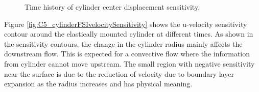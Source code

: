 \begin{figure}[H]
    \centering
    \quad
    \caption{Time history of cylinder center displacement sensitivity.}
    \label{fig:C5_cylinderDisplacementSensitivity}
\end{figure}
%
Figure \ref{fig:C5_cylinderFSIvelocitySensitivity} shows the u-velocity sensitivity contour around the elastically mounted cylinder at different times. As shown in the sensitivity contours, the change in the cylinder radius mainly affects the downstream flow. This is expected for a convective flow where the information from cylinder cannot move upstream. The small region with negative sensitivity near the surface is due to the reduction of velocity due to boundary layer expansion as the radius increases and has physical meaning.
%
